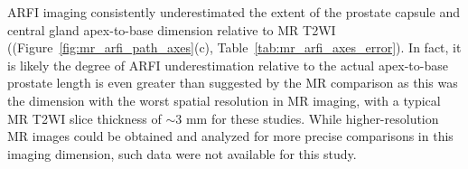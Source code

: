 ARFI imaging consistently underestimated the extent of the prostate capsule and
central gland apex-to-base dimension relative to MR T2WI
((Figure~\ref{fig:mr_arfi_path_axes}(c), Table~\ref{tab:mr_arfi_axes_error}).
In fact, it is likely the degree of ARFI underestimation relative to the actual
apex-to-base prostate length is even greater than suggested by the MR
comparison as this was the dimension with the worst spatial resolution in MR
imaging, with a typical MR T2WI slice thickness of $\sim$3 mm for these
studies.  While higher-resolution MR images could be obtained and analyzed for
more precise comparisons in this imaging dimension, such data were not available
for this study. 
